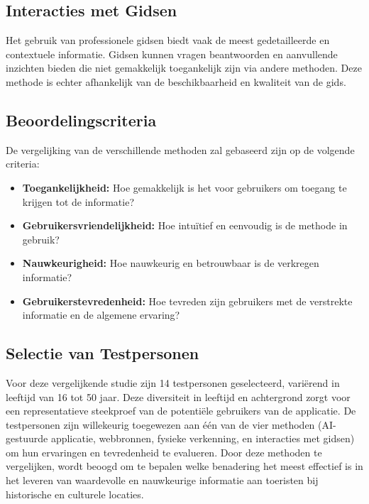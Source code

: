 \subsection{Interacties met Gidsen}
Het gebruik van professionele gidsen biedt vaak de meest gedetailleerde en contextuele informatie. Gidsen kunnen vragen beantwoorden en aanvullende inzichten bieden die niet gemakkelijk toegankelijk zijn via andere methoden. Deze methode is echter afhankelijk van de beschikbaarheid en kwaliteit van de gids.

\subsection{Beoordelingscriteria}
De vergelijking van de verschillende methoden zal gebaseerd zijn op de volgende criteria:
\begin{itemize}
    \item \textbf{Toegankelijkheid:} Hoe gemakkelijk is het voor gebruikers om toegang te krijgen tot de informatie?
    \item \textbf{Gebruikersvriendelijkheid:} Hoe intuïtief en eenvoudig is de methode in gebruik?
    \item \textbf{Nauwkeurigheid:} Hoe nauwkeurig en betrouwbaar is de verkregen informatie?
    \item \textbf{Gebruikerstevredenheid:} Hoe tevreden zijn gebruikers met de verstrekte informatie en de algemene ervaring?
\end{itemize}

\subsection{Selectie van Testpersonen}
Voor deze vergelijkende studie zijn 14 testpersonen geselecteerd, variërend in leeftijd van 16 tot 50 jaar. Deze diversiteit in leeftijd en achtergrond zorgt voor een representatieve steekproef van de potentiële gebruikers van de applicatie. De testpersonen zijn willekeurig toegewezen aan één van de vier methoden (AI-gestuurde applicatie, webbronnen, fysieke verkenning, en interacties met gidsen) om hun ervaringen en tevredenheid te evalueren. Door deze methoden te vergelijken, wordt beoogd om te bepalen welke benadering het meest effectief is in het leveren van waardevolle en nauwkeurige informatie aan toeristen bij historische en culturele locaties.



